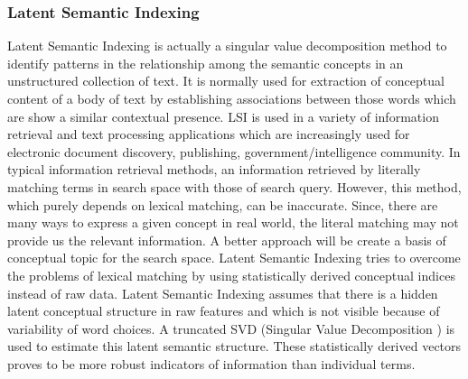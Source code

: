 \subsubsection{Latent Semantic Indexing}
Latent Semantic Indexing is actually a singular value decomposition method to identify patterns in the relationship among the semantic concepts in an unstructured collection of text. It is normally used for extraction of conceptual content of a body of text by establishing associations between those words which are show a similar contextual presence.\cite{Deerwester}
LSI is used in a variety of information retrieval and text processing applications which are increasingly used for electronic document discovery, publishing, government/intelligence community. \cite{e-discovery}
In typical information retrieval methods, an information retrieved by literally matching terms in search space with those of search query. However, this method, which purely depends on lexical matching, can be inaccurate. Since, there are many ways to express a given concept in real world, the literal matching may not provide us the relevant information. A better approach will be create a basis of conceptual topic for the search space. Latent Semantic Indexing tries to overcome the problems of lexical matching by using statistically derived conceptual indices instead of raw data. Latent Semantic Indexing  assumes that there is a hidden latent conceptual structure in raw features and which is not visible because of variability of word choices. A truncated SVD (Singular Value Decomposition ) is used to estimate this latent semantic structure. These statistically derived vectors proves to be more robust indicators of information than individual terms. 

